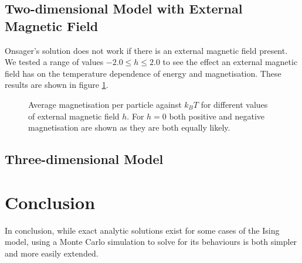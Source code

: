 \documentclass[11pt]{article}
\begin{document}
	\subsection{Two-dimensional Model with External Magnetic Field}
	
	Onsager's solution does not work if there is an external magnetic field present. We tested a range of values $-2.0 \leq h \leq 2.0$ to see the effect an external magnetic field has on the temperature dependence of energy and magnetisation. These results are shown in figure \ref{fig:2d_mag_results}.
	\begin{figure}[H]
		\begin{center}
		\end{center}
		\caption{Average magnetisation per particle against $k_BT$ for different values of external magnetic field $h$. For $h=0$ both positive and negative magnetisation are shown as they are both equally likely.}
		\label{fig:2d_mag_results}
	\end{figure}
	
	\subsection{Three-dimensional Model}
	
	\section{Conclusion}
  
	In conclusion, while exact analytic solutions exist for some cases of the Ising model, using a Monte Carlo simulation to solve for its behaviours is both simpler and more easily extended. 
	
	 
\end{document}
